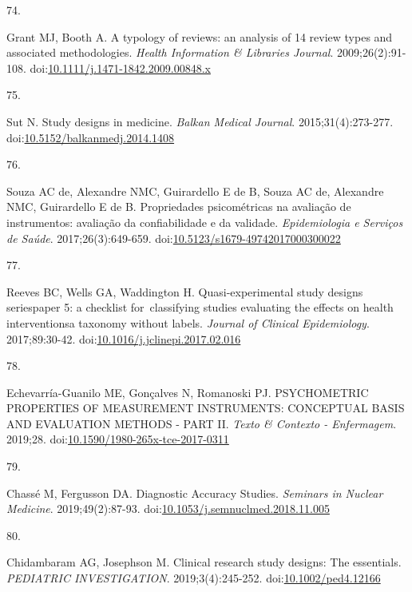 \documentclass[
]{book}
\newlength{\cslhangindent}
\newlength{\csllabelwidth}
\newlength{\cslentryspacingunit} %
\newenvironment{CSLReferences}[2] %
 {%
  \setlength{\parindent}{0pt}
  \ifodd #1
  \let\oldpar\par
  \def\par{\hangindent=\cslhangindent\oldpar}
  \fi
  \setlength{\parskip}{#2\cslentryspacingunit}
 }%
 {}
\newcommand{\CSLLeftMargin}[1]{\parbox[t]{\csllabelwidth}{#1}}
\newcommand{\CSLRightInline}[1]{\parbox[t]{\linewidth - \csllabelwidth}{#1}\break}
\begin{document}
\begin{CSLReferences}{0}{0}
\leavevmode{}%
\CSLLeftMargin{74. }%
\CSLRightInline{Grant MJ, Booth A. A typology of reviews: an analysis of 14 review types and associated methodologies. \emph{Health Information \& Libraries Journal}. 2009;26(2):91-108. doi:\href{https://doi.org/10.1111/j.1471-1842.2009.00848.x}{10.1111/j.1471-1842.2009.00848.x}}

\leavevmode{}%
\CSLLeftMargin{75. }%
\CSLRightInline{Sut N. Study designs in medicine. \emph{Balkan Medical Journal}. 2015;31(4):273-277. doi:\href{https://doi.org/10.5152/balkanmedj.2014.1408}{10.5152/balkanmedj.2014.1408}}

\leavevmode{}%
\CSLLeftMargin{76. }%
\CSLRightInline{Souza AC de, Alexandre NMC, Guirardello E de B, Souza AC de, Alexandre NMC, Guirardello E de B. Propriedades psicométricas na avaliação de instrumentos: avaliação da confiabilidade e da validade. \emph{Epidemiologia e Serviços de Saúde}. 2017;26(3):649-659. doi:\href{https://doi.org/10.5123/s1679-49742017000300022}{10.5123/s1679-49742017000300022}}

\leavevmode{}%
\CSLLeftMargin{77. }%
\CSLRightInline{Reeves BC, Wells GA, Waddington H. Quasi-experimental study designs series{\textemdash}paper 5: a checklist for~classifying studies evaluating the effects on health interventions{\textemdash}a taxonomy without labels. \emph{Journal of Clinical Epidemiology}. 2017;89:30-42. doi:\href{https://doi.org/10.1016/j.jclinepi.2017.02.016}{10.1016/j.jclinepi.2017.02.016}}

\leavevmode{}%
\CSLLeftMargin{78. }%
\CSLRightInline{Echevarría-Guanilo ME, Gonçalves N, Romanoski PJ. PSYCHOMETRIC PROPERTIES OF MEASUREMENT INSTRUMENTS: CONCEPTUAL BASIS AND EVALUATION METHODS - PART II. \emph{Texto \& Contexto - Enfermagem}. 2019;28. doi:\href{https://doi.org/10.1590/1980-265x-tce-2017-0311}{10.1590/1980-265x-tce-2017-0311}}

\leavevmode{}%
\CSLLeftMargin{79. }%
\CSLRightInline{Chassé M, Fergusson DA. Diagnostic Accuracy Studies. \emph{Seminars in Nuclear Medicine}. 2019;49(2):87-93. doi:\href{https://doi.org/10.1053/j.semnuclmed.2018.11.005}{10.1053/j.semnuclmed.2018.11.005}}

\leavevmode{}%
\CSLLeftMargin{80. }%
\CSLRightInline{Chidambaram AG, Josephson M. Clinical research study designs: The essentials. \emph{PEDIATRIC INVESTIGATION}. 2019;3(4):245-252. doi:\href{https://doi.org/10.1002/ped4.12166}{10.1002/ped4.12166}}


\end{CSLReferences}
\end{document}
